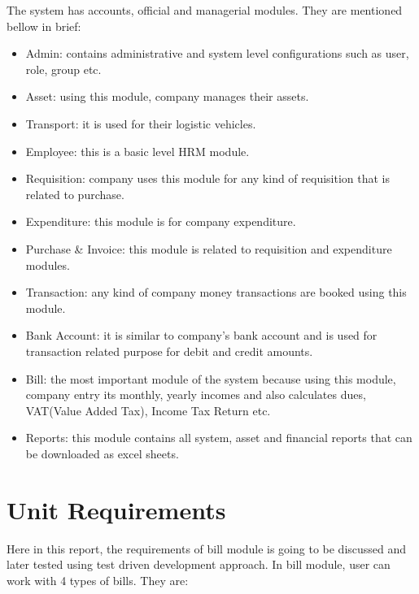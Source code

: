 \documentclass[12pt]{article}
\begin{document}
The system has accounts, official and managerial modules. They are mentioned bellow in brief:

\begin{itemize}

	\item Admin: contains administrative and system level configurations such as user, role, group etc.
    
    \item Asset: using this module, company manages their assets.
    
    \item Transport: it is used for their logistic vehicles.
    
    \item Employee: this is a basic level HRM module.
    
    \item Requisition: company uses this module for any kind of requisition that is related to purchase.
    
    \item Expenditure: this module is for company expenditure.
    
    \item Purchase \& Invoice: this module is related to requisition and expenditure modules.
    
    \item Transaction: any kind of company money transactions are booked using this module.
    
    \item Bank Account: it is similar to company's bank account and is used for transaction related purpose for debit and credit amounts.
    
    \item Bill: the most important module of the system because using this module, company entry its monthly, yearly incomes and also calculates dues, VAT(Value Added Tax), Income Tax Return etc. 
    
    \item Reports: this module contains all system, asset and financial reports that can be downloaded as excel sheets.
    
\end{itemize}

\section{Unit Requirements}
\label{sec:unit-requirements}
Here in this report, the requirements of bill module is going to be discussed and later tested using test driven development approach. In bill module, user can work with 4 types of bills. They are:
\end{document}
